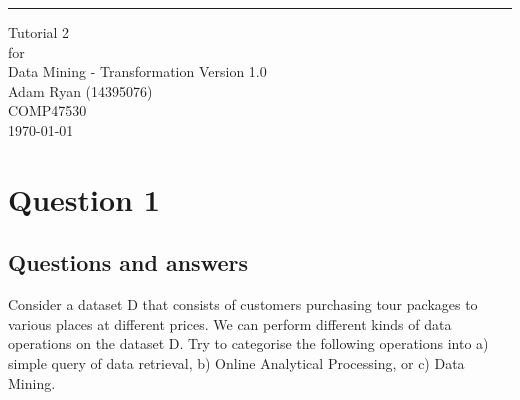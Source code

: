 \documentclass{scrreprt}
\date{}
\def\myversion{1.0}
\begin{document}
	
	\begin{flushright}
		\rule{16cm}{5pt}\vskip1cm
		\begin{bfseries}
			\Huge{Tutorial 2\\}
			\vspace{1.9cm}
			for\\
			\vspace{1.9cm}
			Data Mining - Transformation
			\vspace{1.9cm}
			\LARGE{Version \myversion}\\
			\vspace{1.9cm}
			Adam Ryan (14395076)\\
			\vspace{1.9cm}
			COMP47530\\
			\vspace{1.9cm}
			\today\\
		\end{bfseries}
	\end{flushright}
	
	\tableofcontents

	
\chapter{Question 1}
\section{Questions and answers}\label{E1Q}
Consider a dataset D that consists of customers purchasing tour packages to various places at different prices. We can perform different kinds of data operations on the dataset D. Try to
categorise the following operations into a) simple query of data retrieval, b) Online Analytical Processing, or c) Data Mining.
\end{document}
